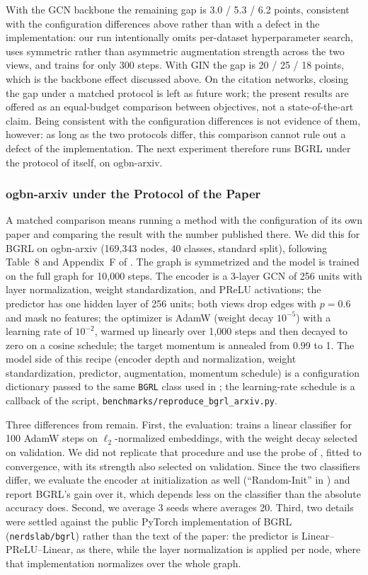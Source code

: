 \documentclass[conference]{IEEEtran}
\begin{document}
With the GCN backbone the remaining gap is 3.0 / 5.3 / 6.2 points, consistent with the configuration differences above rather than with a defect in the implementation: our run intentionally omits per-dataset hyperparameter search, uses symmetric rather than asymmetric augmentation strength across the two views, and trains for only 300 steps. With GIN the gap is 20 / 25 / 18 points, which is the backbone effect discussed above. On the citation networks, closing the gap under a matched protocol is left as future work; the present results are offered as an equal-budget comparison between objectives, not a state-of-the-art claim. Being consistent with the configuration differences is not evidence of them, however: as long as the two protocols differ, this comparison cannot rule out a defect of the implementation. The next experiment therefore runs BGRL under the protocol of \cite{bgrl} itself, on ogbn-arxiv.

\subsubsection{ogbn-arxiv under the Protocol of the Paper}
\label{sec:results-arxiv}
A matched comparison means running a method with the configuration of its own paper and comparing the result with the number published there. We did this for BGRL on ogbn-arxiv \cite{ogb} (169{,}343 nodes, 40 classes, standard split), following Table~8 and Appendix~F of \cite{bgrl}. The graph is symmetrized and the model is trained on the full graph for 10{,}000 steps. The encoder is a 3-layer GCN of 256 units with layer normalization, weight standardization, and PReLU activations; the predictor has one hidden layer of 256 units; both views drop edges with $p{=}0.6$ and mask no features; the optimizer is AdamW (weight decay $10^{-5}$) with a learning rate of $10^{-2}$, warmed up linearly over 1{,}000 steps and then decayed to zero on a cosine schedule; the target momentum is annealed from 0.99 to 1. The model side of this recipe (encoder depth and normalization, weight standardization, predictor, augmentation, momentum schedule) is a configuration dictionary passed to the same \texttt{BGRL} class used in ; the learning-rate schedule is a callback of the script, \texttt{benchmarks/reproduce\_bgrl\_arxiv.py}.

Three differences from \cite{bgrl} remain. First, the evaluation: \cite{bgrl} trains a linear classifier for 100 AdamW steps on $\ell_2$-normalized embeddings, with the weight decay selected on validation. We did not replicate that procedure and use the probe of , fitted to convergence, with its strength also selected on validation. Since the two classifiers differ, we evaluate the encoder at initialization as well (``Random-Init'' in \cite{bgrl}) and report BGRL's gain over it, which depends less on the classifier than the absolute accuracy does. Second, we average 3 seeds where \cite{bgrl} averages 20. Third, two details were settled against the public PyTorch implementation of BGRL (\texttt{nerdslab/bgrl}) rather than the text of the paper: the predictor is Linear--PReLU--Linear, as there, while the layer normalization is applied per node, where that implementation normalizes over the whole graph.
\end{document}

